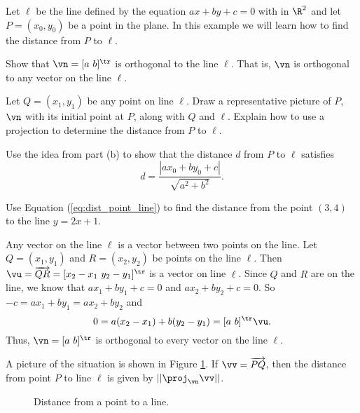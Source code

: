 \begin{example} Let $\ell$ be the line defined by the equation $ax+by+c=0$ with  in $\R^2$ and let $P = (x_0,y_0)$ be a point in the plane. In this example we will learn how to find the distance from $P$ to $\ell$.  
\ba
\item Show that $\vn = [a \ b]^{\tr}$ is orthogonal to the line $\ell$. That is, $\vn$ is orthogonal to any vector on the line $\ell$. 

\item Let $Q = (x_1, y_1)$ be any point on line $\ell$. Draw a representative picture of $P$, $\vn$ with its initial point at $P$, along with $Q$ and $\ell$.  Explain how to use a projection to determine the distance from $P$ to $\ell$. 

\item Use the idea from part (b) to show that the distance $d$ from $P$ to $\ell$ satisfies
\begin{equation} \label{eq:dist_point_line} 
d = \frac{|ax_0+by_0+c|}{\sqrt{a^2+b^2}}.
\end{equation}

\item Use Equation (\ref{eq:dist_point_line}) to find the distance from the point $(3,4)$ to the line $y = 2x+1$. 

\ea

\ExampleSolution
\ba
\item Any vector on the line $\ell$ is a  vector between two points on the line. Let $Q = (x_1,y_1)$ and $R = (x_2,y_2)$ be points on the line $\ell$. Then $\vu = \overrightarrow{QR} = [x_2-x_1 \ y_2-y_1]^{\tr}$ is a vector on line $\ell$. Since $Q$ and $R$ are on the line, we know that $ax_1+by_1+c=0$ and $ax_2+by_2+c = 0$. So $-c = ax_1+by_1 = ax_2+by_2$ and 
\[0 = a(x_2-x_1) + b(y_2-y_1) = [a \ b]^{\tr} \vu.\]
Thus, $\vn = [a \ b]^{\tr}$ is orthogonal to every vector on the line $\ell$. 

\item A picture of the situation is shown in Figure \ref{F:dist_point_line}. If $\vv = \overrightarrow{PQ}$, then the distance from point $P$ to line $\ell$ is given by $||\proj_{\vn} \vv||$. 
\begin{center}
\begin{figure}[ht] 
\begin{center}
\caption{Distance from a point to a line.}
\label{F:dist_point_line}
\end{center}
\end{figure}
\end{center}


\end{example}
